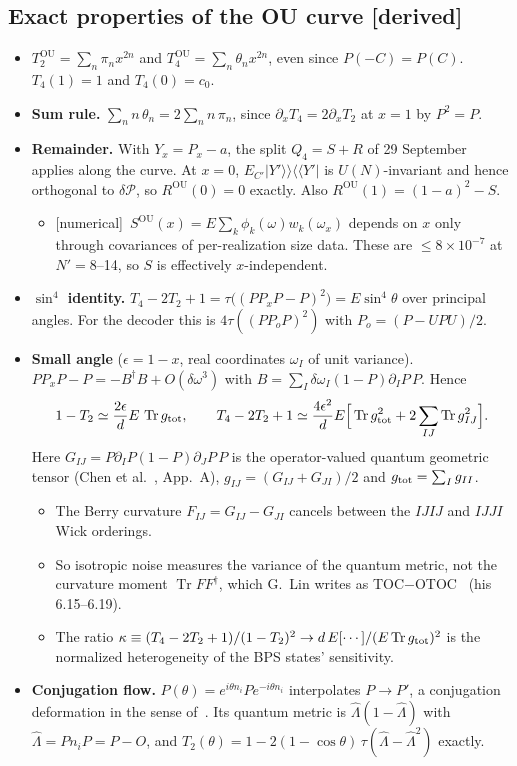 \documentclass[11pt]{article}
\newcommand{\Tr}{\operatorname{Tr}}
\newcommand{\Np}{N'}
\newcommand{\OU}{\mathrm{OU}}
\newcommand{\tagbox}[2]{\textsf{\small\color{#1}[#2]}}
\newcommand{\DER}{\tagbox{cder}{derived}}
\newcommand{\NUM}{\tagbox{cnum}{numerical}}
\theoremstyle{remark}
\begin{document}
\subsection{Exact properties of the OU curve \DER}
\begin{itemize}\itemsep1pt
\item $T_2^\OU=\sum_n\pi_nx^{2n}$ and $T_4^\OU=\sum_n\theta_nx^{2n}$, even since $P(-C)=P(C)$. $T_4(1)=1$ and
  $T_4(0)=c_0$.
\item \textbf{Sum rule.} $\sum_nn\,\theta_n=2\sum_nn\,\pi_n$, since $\partial_xT_4=2\partial_xT_2$ at $x=1$ by $P^2=P$.
\item \textbf{Remainder.} With $Y_x=P_x-a$, the split $Q_4=S+R$ of 29 September applies along the curve. At $x=0$,
  $E_{C'}|Y'\rangle\rangle\langle\langle Y'|$ is $U(N)$-invariant and hence orthogonal to $\delta\mathcal P$, so
  $R^\OU(0)=0$ exactly. Also $R^\OU(1)=(1-a)^2-S$.
  \begin{itemize}\itemsep1pt
  \item \NUM\ $S^\OU(x)=E\sum_k\phi_k(\omega)w_k(\omega_x)$ depends on $x$ only through covariances of per-realization
    size data. These are $\le8\times10^{-7}$ at $\Np=8$--14, so $S$ is effectively $x$-independent.
  \end{itemize}
\item \textbf{$\sin^4$ identity.} $T_4-2T_2+1=\tau\big((PP_xP-P)^2\big)=E\sin^4\theta$ over principal angles. For the
  decoder this is $4\tau((PP_oP)^2)$ with $P_o=(P-UPU)/2$.
\item \textbf{Small angle} ($\epsilon=1-x$, real coordinates $\omega_I$ of unit variance). $PP_xP-P=-B^\dagger B+O(\delta\omega^3)$
  with $B=\sum_I\delta\omega_I(1-P)\partial_IP\,P$. Hence
  \begin{equation}
  1-T_2\simeq\frac{2\epsilon}{d}E\,\Tr g_{\rm tot},\qquad
  T_4-2T_2+1\simeq\frac{4\epsilon^2}{d}E\Big[\Tr g_{\rm tot}^2+2\sum_{IJ}\Tr g_{IJ}^2\Big].
  \label{eq:smallangle}
  \end{equation}
  Here $G_{IJ}=P\partial_IP(1-P)\partial_JP\,P$ is the operator-valued quantum geometric tensor (Chen et al.~\cite{CCMP},
  App.~A), $g_{IJ}=(G_{IJ}+G_{JI})/2$ and $g_{\rm tot}=\sum_Ig_{II}$.
  \begin{itemize}\itemsep1pt
  \item The Berry curvature $F_{IJ}=G_{IJ}-G_{JI}$ cancels between the $IJIJ$ and $IJJI$ Wick orderings.
  \item So isotropic noise measures the variance of the quantum metric, not the curvature moment $\Tr FF^\dagger$, which G.~Lin
    writes as TOC$-$OTOC~\cite{GLin} (his 6.15--6.19).
  \item The ratio $\kappa\equiv(T_4-2T_2+1)/(1-T_2)^2\to d\,E[\cdots]/(E\Tr g_{\rm tot})^2$ is the normalized
    heterogeneity of the BPS states' sensitivity.
  \end{itemize}
\item \textbf{Conjugation flow.} $P(\theta)=e^{i\theta n_i}Pe^{-i\theta n_i}$ interpolates $P\to P'$, a conjugation
  deformation in the sense of~\cite{CCMP}. Its quantum metric is $\hat\Lambda(1-\hat\Lambda)$ with
  $\hat\Lambda=Pn_iP=P-O$, and $T_2(\theta)=1-2(1-\cos\theta)\,\tau(\hat\Lambda-\hat\Lambda^2)$ exactly.
\end{itemize}
\end{document}
